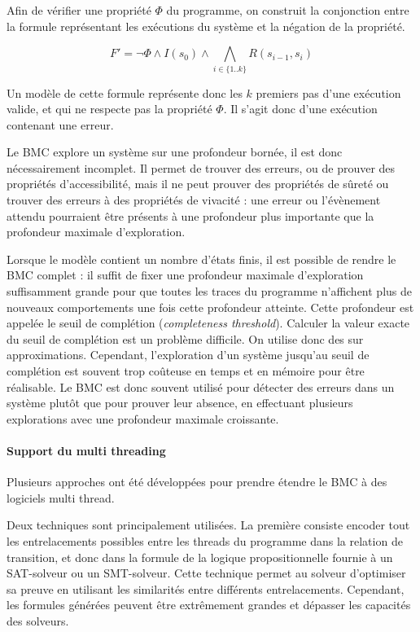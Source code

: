 Afin de vérifier une propriété \(\Phi\) du programme, on construit la
conjonction entre la formule représentant les exécutions du système et la
négation de la propriété.

\[
F' = \lnot \Phi \land I(s_0) \land \bigwedge_{i\in \{1..k\}} R(s_{i-1}, s_i)
\]

Un modèle de cette formule représente donc les \(k\) premiers pas d'une
exécution valide, et qui ne respecte pas la propriété \(\Phi\). Il s'agit donc
d'une exécution contenant une erreur.

Le \ac{BMC} explore un système sur une profondeur bornée, il est donc nécessairement
incomplet. Il permet de trouver des erreurs, ou de prouver des propriétés
d'accessibilité, mais il ne peut prouver des propriétés de sûreté ou trouver des
erreurs à des propriétés de vivacité : une erreur ou l'évènement attendu
pourraient être présents à une profondeur plus importante que la profondeur
maximale d'exploration.

Lorsque le modèle contient un nombre d'états finis, il est possible de rendre le
\ac{BMC} complet : il suffit de fixer une profondeur maximale d'exploration
suffisamment grande pour que toutes les traces du programme n'affichent plus de
nouveaux comportements une fois cette profondeur atteinte. Cette profondeur est appelée le seuil de
complétion (\emph{completeness threshold}). Calculer la valeur exacte du seuil de
complétion est un problème difficile. On utilise donc des sur approximations.
Cependant, l'exploration d'un système jusqu'au seuil de complétion est souvent
trop coûteuse en temps et en mémoire pour être réalisable. Le \ac{BMC} est donc
souvent utilisé pour détecter des erreurs dans un système plutôt que pour
prouver leur absence, en effectuant plusieurs explorations avec une profondeur
maximale croissante.

\paragraph{Support du multi threading}

Plusieurs approches ont été développées pour prendre étendre le \ac{BMC} à des
logiciels multi thread\cite{ESBMC_multithread}.

Deux techniques sont principalement utilisées.
La première consiste encoder tout les entrelacements possibles entre les threads
du programme dans la relation de transition, et donc dans la formule de la
logique propositionnelle fournie à un SAT-solveur ou un SMT-solveur. Cette
technique permet au solveur d'optimiser sa preuve en utilisant les similarités
entre différents entrelacements. Cependant, les formules générées peuvent être
extrêmement grandes et dépasser les capacités des solveurs.

